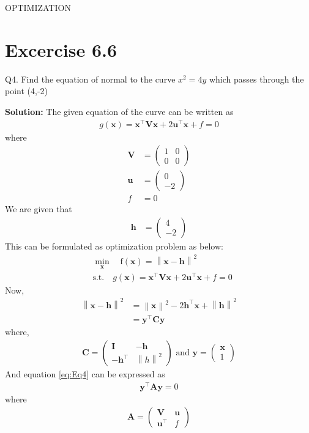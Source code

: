 \documentclass[12pt]{article}
\providecommand{\brak}[1]{\ensuremath{\left(#1\right)}}
\providecommand{\norm}[1]{\left\lVert#1\right\rVert}
\newcommand{\solution}{\noindent \textbf{Solution: }}
\newcommand{\myvec}[1]{\ensuremath{\begin{pmatrix}#1\end{pmatrix}}}
\let\vec\mathbf
\begin{document}
\begin{center}
\textbf\large{OPTIMIZATION}

\end{center}
\section*{Excercise 6.6}

Q4. Find the equation of normal to the curve $x^2=4y$ which passes through the point (4,-2)

\solution
The given equation of the curve can be written as  
\begin{align}
	\label{eq:parabolaEq2}
	g\brak{\vec{x}} = \vec{x}^\top\vec{V}\vec{x} + 2\vec{u}^\top\vec{x} + f = 0 
\end{align}
where
\begin{align}
	\label{eq:eqV}
	\vec{V} &= \myvec{ 1 & 0 \\ 0 & 0} \\
	\label{eq:eqU}
	\vec{u} &= \myvec{0 \\ -2} \\
	\label{eq:eqF}
	f &= 0 
\end{align}
We are given that 
\begin{align}
	\vec{h} &= \myvec{4 \\ -2}
\end{align}
This can be formulated as optimization problem as below:
\begin{align}
	\label{eq:Eq3}
	&  \min_{\vec{x}} \quad \text{f}\brak{\vec{x}} = \norm{\vec{x}-\vec{h}}^2\\
	\label{eq:Eq4}
	& \text{s.t.}\quad g\brak{\vec{x}} = \vec{x}^\top\vec{V}\vec{x} + 2\vec{u}^\top\vec{x} + f = 0  
\end{align}
Now,
\begin{align}
	\norm{\vec{x}-\vec{h}}^2 &= \norm{\vec{x}}^2 - 2\vec{h}^\top\vec{x}+\norm{\vec{h}}^2\\
	&= \vec{y}^\top\vec{C}\vec{y}
\end{align}
where,
\begin{align}
	\vec{C} = \myvec{\vec{I}&-\vec{h}\\-\vec{h}^\top& \norm{h}^2} \text{ and }
	\vec{y} = \myvec{\vec{x}\\1}
\end{align}
And equation \eqref{eq:Eq4} can be expressed as
\begin{align}
	\vec{y}^\top\vec{A}\vec{y} = 0
\end{align}
where
\begin{align}
	\vec{A} = \myvec{\vec{V}&\vec{u}\\\vec{u}^\top & f}
\end{align}
\end{document}
